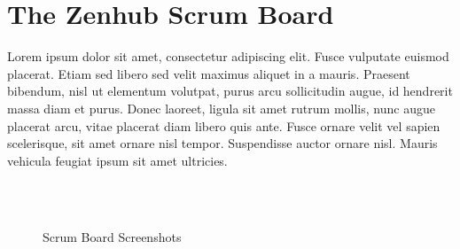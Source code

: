 \documentclass{scrreprt}
\begin{document}
\pagebreak

\section{The Zenhub Scrum Board}
Lorem ipsum dolor sit amet, consectetur adipiscing elit. Fusce vulputate euismod placerat. Etiam sed libero sed velit maximus aliquet in a mauris. Praesent bibendum, nisl ut elementum volutpat, purus arcu sollicitudin augue, id hendrerit massa diam et purus. Donec laoreet, ligula sit amet rutrum mollis, nunc augue placerat arcu, vitae placerat diam libero quis ante. Fusce ornare velit vel sapien scelerisque, sit amet ornare nisl tempor. Suspendisse auctor ornare nisl. Mauris vehicula feugiat ipsum sit amet ultricies.

\begin{figure}[ht!]
     \begin{center}
%
        \\%
        \\%
    \end{center}
    \caption{%
        Scrum Board Screenshots
     }%
   \label{fig:subfigures}
\end{figure}
\end{document}
